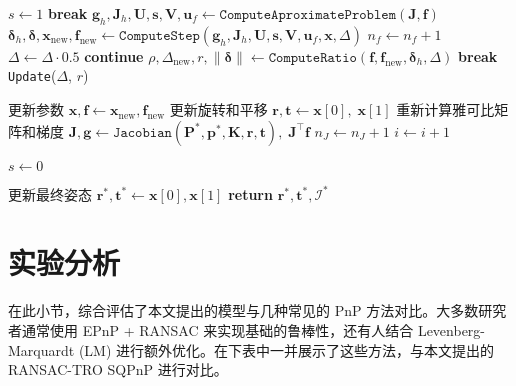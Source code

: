 \begin{algorithm}[!htbp]
\begin{spacing}{0.9}
\begin{algorithmic}[1]
			\State $s \gets 1$
			\State \textbf{break}
			\EndIf
			\State $\mathbf{g}_h, \mathbf{J}_h, \mathbf{U}, \mathbf{s}, \mathbf{V}, \mathbf{u}_f \gets \texttt{ComputeAproximateProblem}(\mathbf{J}, \mathbf{f})$
			\State $\boldsymbol{\delta}_h, \boldsymbol{\delta}, \mathbf{x}_{\text{new}}, \mathbf{f}_{\text{new}} \gets \texttt{ComputeStep}(\mathbf{g}_h, \mathbf{J}_h, \mathbf{U}, \mathbf{s}, \mathbf{V}, \mathbf{u}_f, \mathbf{x}, \Delta)$
			\State $n_f \gets n_f + 1$
			\State $\Delta \gets \Delta \cdot 0.5$
			\State \textbf{continue}
			\EndIf
			\State $\rho, \Delta_{\text{new}}, r, \|\boldsymbol{\delta}\| \gets \texttt{ComputeRatio}(\mathbf{f}, \mathbf{f}_{\text{new}}, \boldsymbol{\delta}_h, \Delta)$
			\State \textbf{break}
			\EndIf
			\State \texttt{Update}($\Delta$, $r$)
			\EndWhile
			
			\State 更新参数 $\mathbf{x}, \mathbf{f} \gets \mathbf{x}_{\text{new}}, \mathbf{f}_{\text{new}}$
			\State 更新旋转和平移 $\mathbf{r}, \mathbf{t} \gets \mathbf{x}[0],\;\mathbf{x}[1]$
			\State 重新计算雅可比矩阵和梯度 
			$\mathbf{J}, \mathbf{g} \gets \texttt{Jacobian}(\mathbf{P}^*, \mathbf{p}^*, \mathbf{K}, \mathbf{r}, \mathbf{t}),\; \mathbf{J}^\top \mathbf{f}$
			\State $n_J \gets n_J + 1$
			\EndIf
			\State $i \gets i + 1$
			\EndWhile
			
			\State $s \gets 0$
			\EndIf
			
			\State 更新最终姿态 $\mathbf{r}^*, \mathbf{t}^* \gets \mathbf{x}[0], \mathbf{x}[1]$
			\State \textbf{return} $\mathbf{r}^*, \mathbf{t}^*, \mathcal{I}^*$
			\EndProcedure
		\end{algorithmic}
	\end{spacing}
\end{algorithm}





\section{实验分析}
\label{sec:RANSAC-TRO-SQPnP:ExperimentCompare}
\vspace{1ex}

在此小节，综合评估了本文提出的模型与几种常见的 PnP 方法对比。大多数研究者通常使用 EPnP \cite{EPnP} + RANSAC 来实现基础的鲁棒性，还有人结合 Levenberg-Marquardt (LM) 进行额外优化。在下表中一并展示了这些方法，与本文提出的 RANSAC-TRO SQPnP 进行对比。

